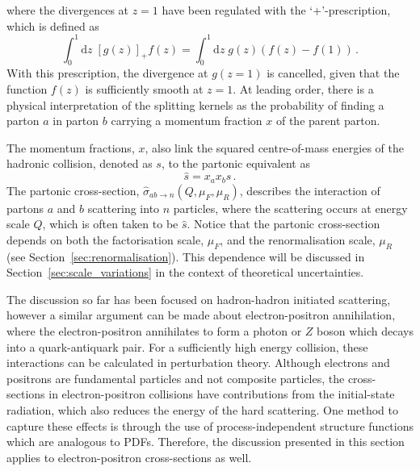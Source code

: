 \documentclass[main.tex]{subfiles}
\begin{document}
    where the divergences at $z=1$ have been regulated
    with the `$+$'-prescription, which is defined as
    \begin{equation}\label{eqn:plus_prescription}
        \int_{0}^{1} \mathrm{d}z \; [g(z)]_{+}f(z) = \int_{0}^{1}\mathrm{d}z \; g(z)(f(z)-f(1)) \, .
    \end{equation}
    With this prescription, the divergence at $g(z=1)$ is cancelled,
    given that the function $f(z)$ is sufficiently smooth at $z=1$.
    At leading order, there is a physical interpretation
    of the splitting kernels as the probability of finding a parton
    $a$ in parton $b$ carrying a momentum fraction $x$ of the parent parton.
    
    The momentum fractions, $x$, also link the
    squared centre-of-mass energies of the hadronic collision,
    denoted as $s$, to the partonic equivalent as
    \begin{equation}\label{eqn:E_cm_partonic}
        \hat{s} = x_{a}x_{b}s \, .
    \end{equation}
    The partonic cross-section, $\hat{\sigma}_{ab \rightarrow n}(Q, \mu_{F}, \mu_{R})$,
    describes the interaction of
    partons $a$ and $b$ scattering into $n$ particles,
    where the scattering occurs at energy scale $Q$,
    which is often taken to be $\hat{s}$.
    Notice that the partonic cross-section depends on
    both the factorisation scale, $\mu_{F}$, and
    the renormalisation scale, $\mu_{R}$
    (see Section~\ref{sec:renormalisation}). This dependence will
    be discussed in Section~\ref{sec:scale_variations}
    in the context of theoretical uncertainties.

    The discussion so far has been focused on hadron-hadron
    initiated scattering, however a similar argument
    can be made about electron-positron annihilation,
    where the electron-positron annihilates to form a
    photon or $Z$ boson which decays into a quark-antiquark
    pair. For a sufficiently high energy collision,
    these interactions can be calculated in perturbation
    theory.
    Although electrons and positrons are fundamental
    particles and not composite particles, the 
    cross-sections in electron-positron collisions
    have contributions from the initial-state radiation,
    which also reduces the energy of the hard scattering.
    One method to capture these effects is through
    the use of process-independent structure functions \cite{Kuraev:1985hb}
    which are analogous to PDFs. Therefore, the discussion
    presented in this section applies to electron-positron
    cross-sections as well.
    
\end{document}
